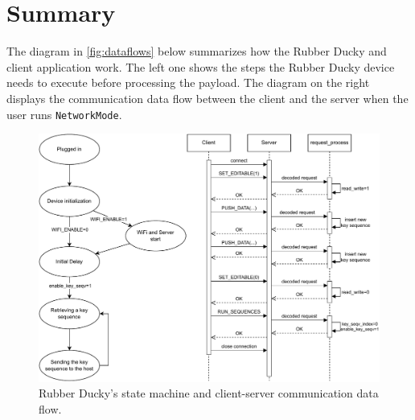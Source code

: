 \section{Summary}
The diagram in \autoref{fig:dataflows} below summarizes how the Rubber Ducky and client application work. The left one shows the steps the Rubber Ducky device needs to execute before processing the payload. The diagram on the right displays the communication data flow between the client and the server when the user runs \verb|NetworkMode|.
\begin{figure}[ht]
    \centering
    \includegraphics[width=0.85\linewidth]{obrazky-figures/summary_diagram.pdf}
    \caption{Rubber Ducky's state machine and client-server communication data flow.}
    \label{fig:dataflows}
\end{figure}


